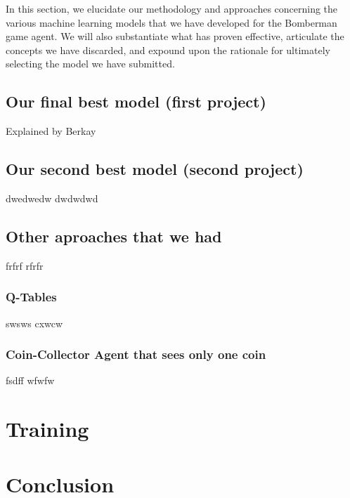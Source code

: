 \documentclass[a4paper,12pt,headsepline, fleqn, english]{scrartcl}%
\begin{document}
	In this section, we elucidate our methodology and approaches concerning the various machine learning models 
	that we have developed for the Bomberman game agent. We will also substantiate what has proven effective, articulate 
	the concepts we have discarded, and expound upon the rationale for ultimately selecting the model we have submitted.

	\subsection{Our final best model (first project)}
	
	Explained by Berkay

	\subsection{Our second best model (second project)}
	dwedwedw
	dwdwdwd

	\subsection{Other aproaches that we had}
	frfrf
	rfrfr

	\subsubsection{Q-Tables}
	swsws
	cxwcw
	
	\subsubsection{Coin-Collector Agent that sees only one coin}
	fsdff
	wfwfw
	
	\section{Training}
	
	
	
	\section{Conclusion}
	
	\newpage	
	
	\printbibliography
\end{document}
